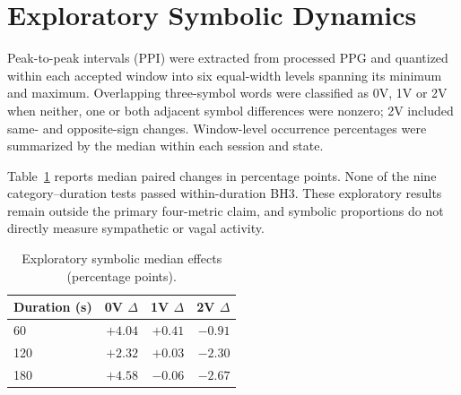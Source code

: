 \documentclass[conference,a4paper]{IEEEtran}
\begin{document}
\section{Exploratory Symbolic Dynamics}\label{sec:supp_8}
Peak-to-peak intervals (PPI) were extracted from processed PPG and quantized within each accepted window into six equal-width levels spanning its minimum and maximum. Overlapping three-symbol words were classified as 0V, 1V or 2V when neither, one or both adjacent symbol differences were nonzero; 2V included same- and opposite-sign changes. Window-level occurrence percentages were summarized by the median within each session and state.

Table~\ref{tab:supp_symbolic} reports median paired changes in percentage points. None of the nine category--duration tests passed within-duration BH3. These exploratory results remain outside the primary four-metric claim, and symbolic proportions do not directly measure sympathetic or vagal activity.

\begin{table}[!t]
\centering
\caption{Exploratory symbolic median effects (percentage points).}\label{tab:supp_symbolic}
\footnotesize
\setlength{\tabcolsep}{3pt}
\renewcommand{\arraystretch}{1.05}
\begin{tabular}{@{}lrrr@{}}
\toprule
Duration (s) & 0V $\Delta$ & 1V $\Delta$ & 2V $\Delta$\\
\midrule
60 & $+4.04$ & $+0.41$ & $-0.91$\\
120 & $+2.32$ & $+0.03$ & $-2.30$\\
180 & $+4.58$ & $-0.06$ & $-2.67$\\
\bottomrule
\end{tabular}
\end{table}
\FloatBarrier
\end{document}
